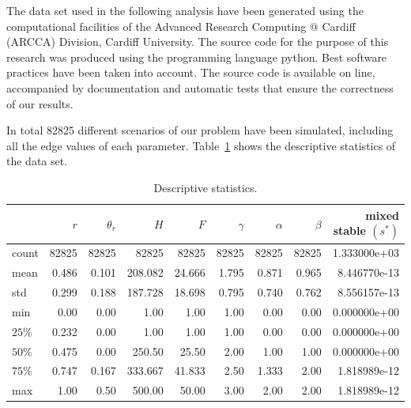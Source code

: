 \documentclass[10pt]{article}
\begin{document}
The data set used in the following analysis have been generated using the 
computational facilities of the Advanced Research Computing @ Cardiff (ARCCA) 
Division, Cardiff University. The source code for the purpose of this
research was produced using the programming language python. Best software
practices have been taken into account. The source code is available on line, %
accompanied by documentation and automatic tests that ensure the correctness
of our results.

In total 82825 different scenarios of our problem have been simulated, including
all the edge values of each parameter. Table~\ref{tbl:descriptive_stats} shows
the descriptive statistics of the data set.

\begin{table}[!hbtp]
	\begin{center}
\begin{tabular}{lrrrrrrrr}
\toprule {} &              \(r\) &        \(\theta_r\) &              \(H\) &              \(F\) &          \(\gamma\) &          \(\alpha\) &          \(\beta\) &  mixed stable \((s^*)\)\\
\midrule
count         &  82825 &  82825 &  82825 &  82825 &  82825 &  82825 &  82825 &   1.333000e+03 \\
mean         &     0.486 &      0.101 &    208.082 &     24.666 &      1.795 &      0.871 &      0.965 & 8.446770e-13 \\
std             &       0.299 &      0.188 &    187.728 &     18.698 &      0.795 &      0.740 &      0.762 &      8.556157e-13 \\
min   		&         0.00 &      0.00 &      1.00 &      1.00 &      1.00 &      0.00 &      0.00 &    0.000000e+00 \\
\(25\)\%  	&      0.232 &      0.00 &      1.00 &      1.00 &      1.00 &      0.00 &      0.00 &     0.000000e+00 \\
\(50\)\%  	&      0.475 &      0.00 &    250.50 &     25.50 &      2.00 &      1.00 &      1.00 &      0.000000e+00 \\
\(75\)\%  	&       0.747 &      0.167 &    333.667 &     41.833 &      2.50 &      1.333 &      2.00 &        1.818989e-12 \\
max   		&       1.00 &      0.50 &    500.00 &     50.00 &      3.00 &      2.00 &      2.00 &           1.818989e-12 \\
\bottomrule
\end{tabular}
      \caption{Descriptive statistics.}
      \label{tbl:descriptive_stats}
  	\end{center}
\end{table}
\end{document}
